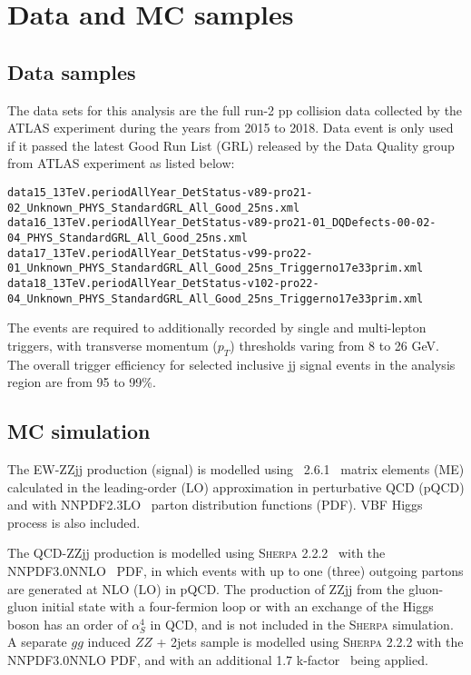 \section{Data and MC samples}

\subsection{Data samples}

The data sets for this analysis are the full run-2 pp collision data collected by the ATLAS experiment during the years from 2015 to 2018.
Data event is only used if it passed the latest Good Run List (GRL) released by the Data Quality group from ATLAS experiment as listed below:


{\tiny
\begin{verbatim}
data15_13TeV.periodAllYear_DetStatus-v89-pro21-02_Unknown_PHYS_StandardGRL_All_Good_25ns.xml
data16_13TeV.periodAllYear_DetStatus-v89-pro21-01_DQDefects-00-02-04_PHYS_StandardGRL_All_Good_25ns.xml
data17_13TeV.periodAllYear_DetStatus-v99-pro22-01_Unknown_PHYS_StandardGRL_All_Good_25ns_Triggerno17e33prim.xml
data18_13TeV.periodAllYear_DetStatus-v102-pro22-04_Unknown_PHYS_StandardGRL_All_Good_25ns_Triggerno17e33prim.xml
\end{verbatim}
}

The events are required to additionally recorded by single and multi-lepton triggers, with transverse momentum ($p_{T}$) thresholds varing from 8 to 26 GeV.
The overall trigger efficiency for selected inclusive \llll jj signal events in the analysis region are from 95 to 99\%.

\subsection{MC simulation}
\label{sec:mc}

The EW-ZZjj production (signal) is modelled using \MGMCatNLO~2.6.1~\cite{Alwall:2014hca} matrix elements (ME) calculated in the leading-order (LO) approximation
in perturbative QCD (pQCD) and with NNPDF2.3LO~\cite{Ball:2012cx} parton distribution functions (PDF).
VBF Higgs process is also included.

The QCD-ZZjj production is modelled using \textsc{Sherpa} 2.2.2~\cite{Gleisberg:2008ta} with the NNPDF3.0NNLO~\cite{ball2015parton} PDF,
in which events with up to one (three) outgoing partons are generated at NLO (LO) in pQCD.
The production of ZZjj from the gluon-gluon initial state with a four-fermion loop or with an exchange of the Higgs boson has an order of $\alpha_{S}^{4}$ in QCD,
and is not included in the \textsc{Sherpa} simulation.
A separate $gg$ induced $ZZ$ + 2jets sample is modelled using \textsc{Sherpa} 2.2.2 with the NNPDF3.0NNLO PDF,
and with an additional 1.7 k-factor~\cite{PhysRevD.92.094028} being applied.

